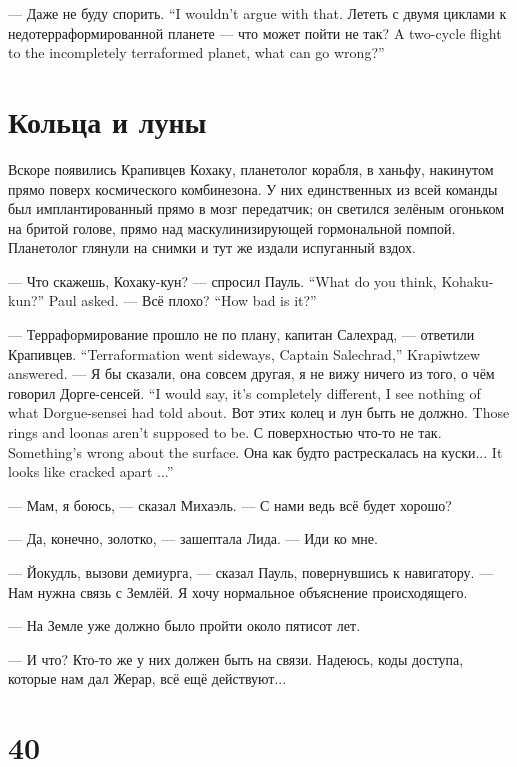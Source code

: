 {--- Даже не буду спорить.}
{``I wouldn't argue with that.}
{Лететь с двумя циклами к недотерраформированной планете --- что может пойти не так?}
{A two-cycle flight to the incompletely terraformed planet, what can go wrong?''}

\section{Кольца и луны}

Вскоре появились Крапивцев Кохаку, планетолог корабля, в ханьфу, накинутом прямо поверх космического комбинезона.
У них единственных из всей команды был имплантированный прямо в мозг передатчик;
он светился зелёным огоньком на бритой голове, прямо над маскулинизирующей гормональной помпой.
Планетолог глянули на снимки и тут же издали испуганный вздох.

{--- Что скажешь, Кохаку-кун? --- спросил Пауль.}
{``What do you think, Kohaku-kun?'' Paul asked.}
{--- Всё плохо?}
{``How bad is it?''}

{--- Терраформирование прошло не по плану, капитан Салехрад, --- ответили Крапивцев.}
{``Terraformation went sideways, Captain Salechrad,'' Krapiwtzew answered.}
{--- Я бы сказали, она совсем другая, я не вижу ничего из того, о чём говорил Дорге-сенсей.}
{``I would say, it's completely different, I see nothing of what Dorgue-sensei had told about.}
{Вот этиx колец и лун быть не должно.}
{Those rings and loonas aren't supposed to be.}
{С поверхностью что-то не так.}
{Something's wrong about the surface.}
{Она как будто растрескалась на куски...}
{It looks like cracked apart ...''}

--- Мам, я боюсь, --- сказал Михаэль.
--- С нами ведь всё будет хорошо?

--- Да, конечно, золотко, --- зашептала Лида.
--- Иди ко мне.

--- Йокудль, вызови демиурга, --- сказал Пауль, повернувшись к навигатору.
--- Нам нужна связь с Землёй.
Я хочу нормальное объяснение происходящего.

--- На Земле уже должно было пройти около пятисот лет.

--- И что?
Кто-то же у них должен быть на связи.
Надеюсь, коды доступа, которые нам дал Жерар, всё ещё действуют...

\section{40}

